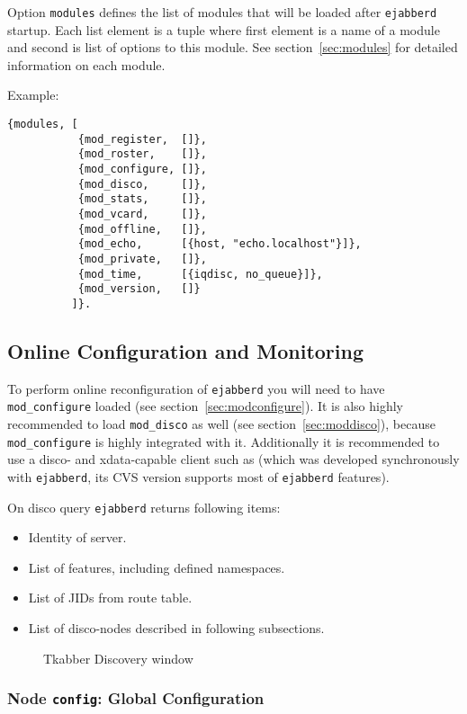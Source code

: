 \documentclass[10pt]{article}
\newcommand{\imgscale}{0.58}
\newcommand{\insimg}[1]{\insscaleimg{\imgscale}{#1}}
\newcommand{\insscaleimg}[2]{
  \imgsrc{#2}{}
  \begin{latexonly}
    \scalebox{#1}{\texttt{[image: \#2]}}
  \end{latexonly}
}
\newcommand{\ejabberd}{\texttt{ejabberd}}
\newcommand{\modconfigure}{\texttt{mod\_configure}}
\newcommand{\moddisco}{\texttt{mod\_disco}}
\begin{document}
Option \texttt{modules} defines the list of modules that will be loaded after
\ejabberd{} startup.  Each list element is a tuple where first element is a
name of a module and second is list of options to this module.  See
section~\ref{sec:modules} for detailed information on each module.

Example:
\begin{verbatim}
{modules, [
           {mod_register,  []},
           {mod_roster,    []},
           {mod_configure, []},
           {mod_disco,     []},
           {mod_stats,     []},
           {mod_vcard,     []},
           {mod_offline,   []},
           {mod_echo,      [{host, "echo.localhost"}]},
           {mod_private,   []},
           {mod_time,      [{iqdisc, no_queue}]},
           {mod_version,   []}
          ]}.
\end{verbatim}


\subsection{Online Configuration and Monitoring}
\label{sec:onlineconfig}

To perform online reconfiguration of \ejabberd{} you will need to have
\modconfigure{} loaded (see section~\ref{sec:modconfigure}). It is also highly
recommended to load \moddisco{} as well (see section~\ref{sec:moddisco}),
because \modconfigure{} is highly integrated with it.  Additionally it is
recommended to use a disco- and xdata-capable client such as
(which was developed synchronously with \ejabberd{}, its CVS version
supports most of \ejabberd{} features).




On disco query \ejabberd{} returns following items:
\begin{itemize}
\item Identity of server.
\item List of features, including defined namespaces.
\item List of JIDs from route table.
\item List of disco-nodes described in following subsections.
\end{itemize}
\begin{figure}[htbp]
  \centering
  \insimg{disco.png}
  \caption{Tkabber Discovery window}
  \label{fig:disco}
\end{figure}

\subsubsection{Node \texttt{config}: Global Configuration}
\end{document}
